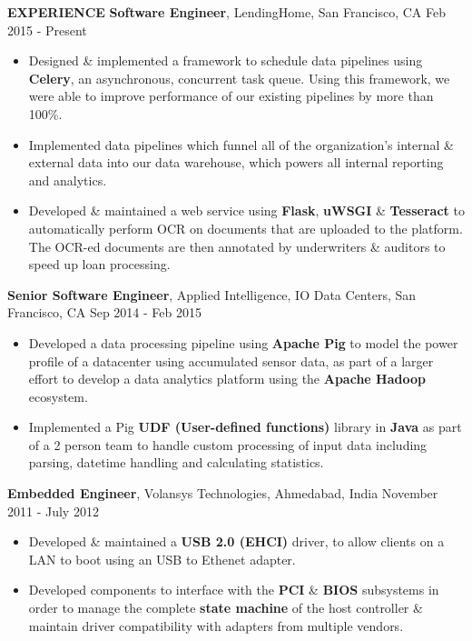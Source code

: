 \documentclass[10pt, letterpaper]{article}
\begin{document}
\textbf{EXPERIENCE}
\smallskip
\newline
\textbf{Software Engineer}, LendingHome, San Francisco, CA \hfill Feb 2015 - Present
\begin{itemize}
    \item Designed \& implemented a framework to schedule data pipelines using \textbf{Celery}, an asynchronous, concurrent task queue.
  Using this framework, we were able to improve performance of our existing pipelines by more than 100\%.
    \item Implemented data pipelines which funnel all of the organization's internal \& external data into our data warehouse,
  which powers all internal reporting and analytics.
    \item Developed \& maintained a web service using \textbf{Flask}, \textbf{uWSGI} \& \textbf{Tesseract} to automatically perform OCR on documents
  that are uploaded to the platform. The OCR-ed documents are then annotated by underwriters \& auditors to speed up loan processing.
\end{itemize}
\textbf{Senior Software Engineer}, Applied Intelligence, IO Data Centers, San Francisco, CA \hfill Sep 2014 - Feb 2015
\begin{itemize}
    \item Developed a data processing pipeline using \textbf{Apache Pig} to model 
the power profile of a datacenter using accumulated sensor data, as part of a larger effort to develop a data analytics
platform using the \textbf{Apache Hadoop} ecosystem.
    \item Implemented a Pig \textbf{UDF (User-defined functions)} library in \textbf{Java} as part of a 2 person team
to handle custom processing of input data including parsing, datetime handling and
calculating statistics.
\end{itemize}

\textbf{Embedded Engineer}, Volansys Technologies, Ahmedabad, India \hfill November 2011 - July 2012
\begin{itemize}
    \item Developed \& maintained a \textbf{USB 2.0 (EHCI)} driver, to allow 
clients on a LAN to boot using an USB to Ethenet adapter.
    \item Developed components to interface with the \textbf{PCI} \& \textbf{BIOS} 
subsystems in order to manage the complete \textbf{state machine} of the host controller
\& maintain driver compatibility with adapters from multiple vendors. 
\end{itemize}
\end{document}
